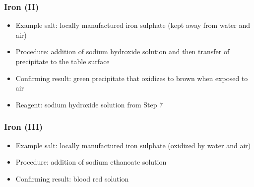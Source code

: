 \subsubsection{Iron (II)}
\begin{itemize}
\item{Example salt: locally manufactured iron sulphate 
(kept away from water and air)}
\item{Procedure: addition of sodium hydroxide solution 
and then transfer of precipitate to the table surface}
\item{Confirming result: green precipitate 
that oxidizes to brown when exposed to air}
\item{Reagent: sodium hydroxide solution from Step 7}
\end{itemize}

\subsubsection{Iron (III)}
\begin{itemize}
\item{Example salt: locally manufactured iron sulphate 
(oxidized by water and air)}
\item{Procedure: addition of sodium ethanoate solution}
\item{Confirming result: blood red solution}
\end{itemize}

